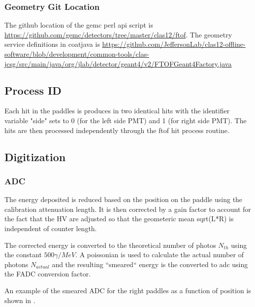 \subsubsection{Geometry Git Location}
The github location of the gemc perl api script is \url{https://github.com/gemc/detectors/tree/master/clas12/ftof}.
The geometry service definitions in coatjava is \url{https://github.com/JeffersonLab/clas12-offline-software/blob/development/common-tools/clas-jcsg/src/main/java/org/jlab/detector/geant4/v2/FTOFGeant4Factory.java}

\subsection{Process ID}

Each hit in the paddles is produces in two identical hits with the identifier variable "side" sets to 0 (for the left side PMT) and 1 (for right side PMT).
The hits are then processed independently through the ftof hit process routine.

\subsection{Digitization}

\subsubsection{ADC}
The energy deposited is reduced based on the position on the paddle using the calibration attenuation length. It is then corrected by a gain factor
to account for the fact that the HV are adjusted so that the geometeric mean sqrt(L*R) is independent of counter length.

The corrected energy is converted to the theoretical number of photos $N_{th}$ using the constant $500 \gamma / MeV $. A poissonian is used to
calculate the actual number of photons $N_{actual}$ and the resulting ``smeared`` energy is the converted to adc using the FADC conversion factor.

An example of the smeared ADC for the right paddles as a function of position is shown in .

